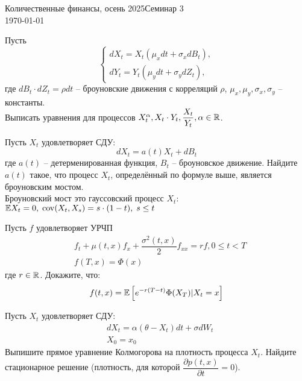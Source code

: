 \documentclass[12pt]{article}
\begin{document}
\noindent Количественные финансы, осень 2025\hfill Семинар 3\\
\today

\hrulefill
\begin{problem}
    Пусть
    $$\begin{cases}
        dX_t = X_t (\mu_x dt + \sigma_x dB_t), \\
        dY_t = Y_t (\mu_y dt + \sigma_y dZ_t),
    \end{cases}$$
    где $dB_t\cdot dZ_t = \rho dt$ -- броуновские движения с корреляций $\rho$, $\mu_x, \mu_y, \sigma_x, \sigma_y$ -- константы.
    \\ Выписать уравнения для процессов $X_t^{\alpha}, X_t \cdot Y_t, \dfrac{X_t}{Y_t}, \alpha \in \mathbb{R}$.
\end{problem}


\begin{problem}
    Пусть $X_t$ удовлетворяет СДУ:    
    $$
        dX_t = a(t) X_t + dB_t
    $$ где $a(t)$ -- детерменированная функция, $B_t$ -- броуновское движение. 
    Найдите $a(t)$ такое, что процесс $X_t$, определённый по формуле выше, является броуновским мостом.
    \\ Броуновский мост это гауссовский процесс $X_t$: $\mathbb{E} X_t = 0, \; \mathrm{cov}(X_t, X_s) = s\cdot (1 - t), \; s \leq t$
\end{problem}

\begin{problem}
    Пусть $f$ удовлетворяет УРЧП
    \begin{align*}
        &f_t + \mu(t, x) f_x + \dfrac{\sigma^2(t, x)}{2} f_{xx} = rf, 0 \leq t < T \\
        &f(T, x) = \Phi(x)
    \end{align*}
    где $r \in \mathbb{R}$. Докажите, что:
    $$
        f(t, x) = \mathbb{E} \left[ e^{-r(T-t)} \Phi(X_T) | X_t = x\right]
    $$
\end{problem}

\begin{problem}
    Пусть $X_t$ удовлетворяет СДУ:
    \begin{align*}
        &dX_t = \alpha (\theta - X_t) dt + \sigma dW_t \\
        &X_0 = x_0
    \end{align*}
    Выпишите прямое уравнение Колмогорова на плотность процесса $X_t$. Найдите стационарное решение (плотность, для которой $\dfrac{\partial p(t, x)}{\partial t} = 0$).
\end{problem}
\end{document}

